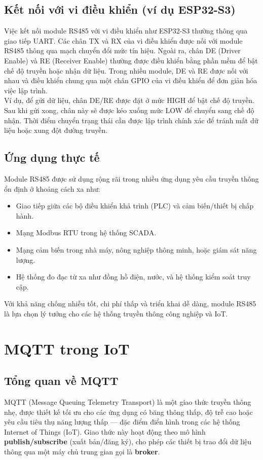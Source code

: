 \subsection{Kết nối với vi điều khiển (ví dụ ESP32-S3)} 
\tab Việc kết nối module RS485 với vi điều khiển như ESP32-S3 thường thông qua giao tiếp UART. Các chân TX và RX của vi điều khiển được nối với module RS485 thông qua mạch chuyển đổi mức tín hiệu. Ngoài ra, chân DE (Driver Enable) và RE (Receiver Enable) thường được điều khiển bằng phần mềm để bật chế độ truyền hoặc nhận dữ liệu. Trong nhiều module, DE và RE được nối với nhau và điều khiển chung qua một chân GPIO của vi điều khiển để đơn giản hóa việc lập trình.\\
\tab Ví dụ, để gửi dữ liệu, chân DE/RE được đặt ở mức HIGH để bật chế độ truyền. Sau khi gửi xong, chân này sẽ được kéo xuống mức LOW để chuyển sang chế độ nhận. Thời điểm chuyển trạng thái cần được lập trình chính xác để tránh mất dữ liệu hoặc xung đột đường truyền.

\subsection{Ứng dụng thực tế} 
\tab Module RS485 được sử dụng rộng rãi trong nhiều ứng dụng yêu cầu truyền thông ổn định ở khoảng cách xa như: 
\begin{itemize} 
  \item Giao tiếp giữa các bộ điều khiển khả trình (PLC) và cảm biến/thiết bị chấp hành. 
  \item Mạng Modbus RTU trong hệ thống SCADA. 
  \item Mạng cảm biến trong nhà máy, nông nghiệp thông minh, hoặc giám sát năng lượng. 
  \item Hệ thống đo đạc từ xa như đồng hồ điện, nước, và hệ thống kiểm soát truy cập. 
\end{itemize} 
\tab Với khả năng chống nhiễu tốt, chi phí thấp và triển khai dễ dàng, module RS485 là lựa chọn lý tưởng cho các hệ thống truyền thông công nghiệp và IoT.

\section{MQTT trong IoT}

\subsection{Tổng quan về MQTT}

MQTT (Message Queuing Telemetry Transport) là một giao thức truyền thông nhẹ, được thiết kế tối ưu cho các ứng dụng có băng thông thấp, độ trễ cao hoặc yêu cầu tiêu thụ năng lượng thấp — đặc điểm điển hình trong các hệ thống Internet of Things (IoT). Giao thức này hoạt động theo mô hình \textbf{publish/subscribe} (xuất bản/đăng ký), cho phép các thiết bị trao đổi dữ liệu thông qua một máy chủ trung gian gọi là \textbf{broker}.

